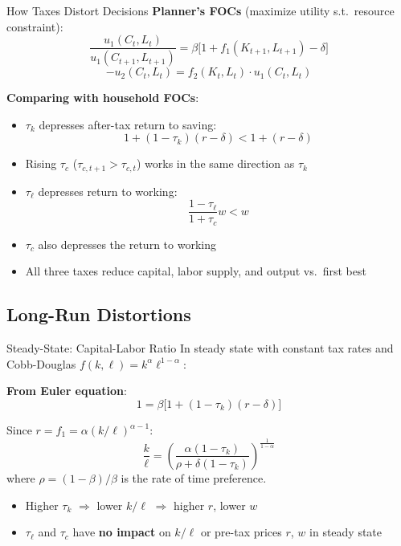 \documentclass[blue]{beamer}
\begin{document}
\begin{frame}{How Taxes Distort Decisions}
	\textbf{Planner's FOCs} (maximize utility s.t.\ resource constraint):
	\[
	\frac{u_1(C_t, L_t)}{u_1(C_{t+1}, L_{t+1})} = \beta\bigl[1 + f_1(K_{t+1}, L_{t+1}) - \delta\bigr]
	\]
	\[
	-u_2(C_t, L_t) = f_2(K_t, L_t) \cdot u_1(C_t, L_t)
	\]
	
	\textbf{Comparing with household FOCs}:
	\vspace{-7pt}
	\begin{itemize}
		\item $\tau_k$ {depresses after-tax return to saving}: 
		$$
		1 + (1-\tau_k)(r-\delta) < 1 + (r-\delta)
		$$
		\item Rising $\tau_c$ ($\tau_{c,t+1} > \tau_{c,t}$) works in the same direction as $\tau_k$
		\item $\tau_\ell$ {depresses return to working}: $$
		\frac{1-\tau_\ell}{1+\tau_c} w < w
		$$
		\item $\tau_c$ also depresses the return to working
		\item All three taxes reduce capital, labor supply, and output vs.\ first best
	\end{itemize}
\end{frame}


\subsection{Long-Run Distortions}

\begin{frame}{Steady-State: Capital-Labor Ratio}
	In steady state with constant tax rates and Cobb-Douglas $f(k,\ell) = k^\alpha \ell^{1-\alpha}$:
	
	\textbf{From Euler equation}:
	\[
	1 = \beta\bigl[1 + (1-\tau_k)(r-\delta)\bigr]
	\]
	
	Since $r = f_1 = \alpha(k/\ell)^{\alpha-1}$:
	\[
	{\frac{k}{\ell} = \left(\frac{\alpha(1-\tau_k)}{\rho + \delta(1-\tau_k)}\right)^{\!\frac{1}{1-\alpha}}}
	\]
	where $\rho = (1-\beta)/\beta$ is the rate of time preference.
	
	\bigskip
	\begin{itemize}
		\item Higher $\tau_k$ $\Rightarrow$ lower $k/\ell$ $\Rightarrow$ higher $r$, lower $w$
		\item $\tau_\ell$ and $\tau_c$ have \textbf{no impact} on $k/\ell$ or pre-tax prices $r$, $w$ in steady state
	\end{itemize}
\end{frame}
\end{document}
